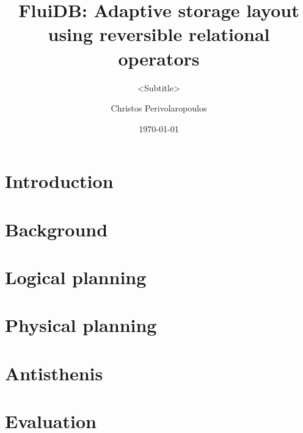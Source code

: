 \documentclass{beamer}
\title{FluiDB: Adaptive storage layout using reversible relational operators}
\subtitle{<Subtitle>}
\author{Christos Perivolaropoulos}
\institute{University of Edinburgh}
\date{\today}
\begin{document}
\begin{frame}
\titlepage
\end{frame}

\section{Introduction}
\label{section:introduction}


\section{Background}
\label{section:background}


\section{Logical planning}
\label{section:fluidb_logical_planning}


\section{Physical planning}
\label{section:physical_planning}


\section{Antisthenis}
\label{section:antisthenis}


% 

\section{Evaluation}
\label{section:evaluation}


% 
\end{document}
